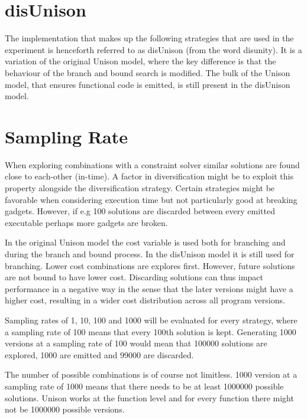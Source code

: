 
\section{disUnison}

The implementation that makes up the following strategies that are used in the experiment
is henceforth referred to as disUnison (from the word disunity). It is a variation of the
original Unison model, where the key difference is that the behaviour of the branch and
bound search is modified. The bulk of the Unison model, that ensures functional code is
emitted, is still present in the disUnison model.



\section{Sampling Rate}
\label{sec:sampling_rate}

When exploring combinations with a constraint solver similar solutions are found close to
each-other (in-time). A factor in diversification might be to exploit this property
alongside the diversification strategy. Certain strategies might be favorable when
considering execution time but not particularly good at breaking gadgets. However, if
e.g 100 solutions are discarded between every emitted executable perhaps more gadgets are
broken.

In the original Unison model the cost variable is used both for branching and during the
branch and bound process. In the disUnison model it is still used for branching. Lower
cost combinations are explores first. However, future solutions are not bound to have
lower cost. Discarding solutions can thus impact performance in a negative way in the
sense that the later versions might have a higher cost, resulting in a wider cost
distribution across all program versions.

Sampling rates of 1, 10, 100 and 1000 will be evaluated for every strategy, where a
sampling rate of 100 means that every 100th solution is kept. Generating 1000 versions
at a sampling rate of 100 would mean that 100000 solutions are explored, 1000 are emitted
and 99000 are discarded.

The number of possible combinations is of course not limitless. 1000 version at a sampling
rate of 1000 means that there needs to be at least 1000000 possible solutions. Unison works
at the function level and for every function there might not be 1000000 possible versions.

